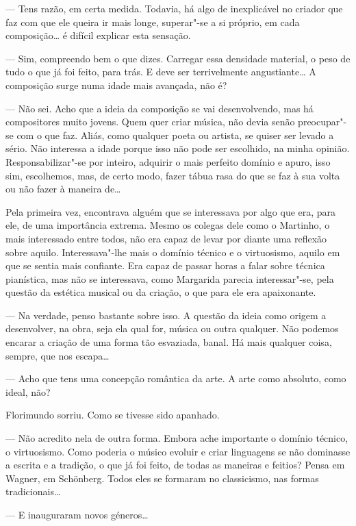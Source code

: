 --- Tens razão, em certa medida. Todavia, há algo de inexplicável no
criador que faz com que ele queira ir mais longe, superar"-se a si
próprio, em cada composição\ldots{} é difícil explicar esta sensação.

--- Sim, compreendo bem o que dizes. Carregar essa densidade material, o
peso de tudo o que já foi feito, para trás. E deve ser terrivelmente
angustiante\ldots{} A composição surge numa idade mais avançada, não é?

--- Não sei. Acho que a ideia da composição se vai desenvolvendo, mas há
compositores muito jovens. Quem quer criar música, não devia senão
preocupar"-se com o que faz. Aliás, como qualquer poeta ou artista, se
quiser ser levado a sério. Não interessa a idade porque isso não pode
ser escolhido, na minha opinião. Responsabilizar"-se por inteiro,
adquirir o mais perfeito domínio e apuro, isso sim, escolhemos, mas, de
certo modo, fazer tábua rasa do que se faz à sua volta ou não fazer à
maneira de\ldots{}

Pela primeira vez, encontrava alguém que se interessava por algo que
era, para ele, de uma importância extrema. Mesmo os colegas dele como o
Martinho, o mais interessado entre todos, não era capaz de levar por
diante uma reflexão sobre aquilo. Interessava"-lhe mais o domínio técnico
e o virtuosismo, aquilo em que se sentia mais confiante. Era capaz de
passar horas a falar sobre técnica pianística, mas não se interessava,
como Margarida parecia interessar"-se, pela questão da estética musical
ou da criação, o que para ele era apaixonante.

--- Na verdade, penso bastante sobre isso. A questão da ideia como origem
a desenvolver, na obra, seja ela qual for, música ou outra qualquer. Não
podemos encarar a criação de uma forma tão esvaziada, banal. Há mais
qualquer coisa, sempre, que nos escapa\ldots{}

--- Acho que tens uma concepção romântica da arte. A arte como absoluto,
como ideal, não?

Florimundo sorriu. Como se tivesse sido apanhado.

--- Não acredito nela de outra forma. Embora ache importante o domínio
técnico, o virtuosismo. Como poderia o músico evoluir e criar linguagens
se não dominasse a escrita e a tradição, o que já foi feito, de todas as
maneiras e feitios? Pensa em Wagner, em Schönberg. Todos eles se
formaram no classicismo, nas formas tradicionais\ldots{}

--- E inauguraram novos géneros\ldots{}

